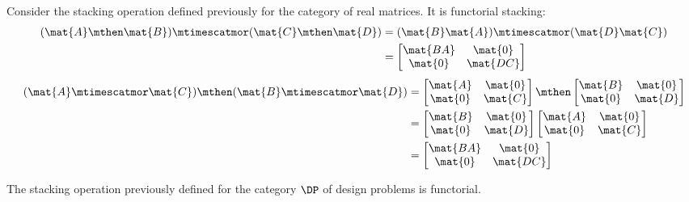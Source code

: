 \begin{example}
    Consider the stacking operation defined previously for the category of real matrices.
    It is functorial stacking:
    \begin{align}
        (\mat{A} \mthen \mat{B}) \mtimescatmor (\mat{C} \mthen \mat{D}) & = (\mat{B}\mat{A}) \mtimescatmor (\mat{D}\mat{C}) \\
                                                                        & =
        \begin{bmatrix}
            \mat{BA} & \mat{0}  \\
            \mat{0}  & \mat{DC}
        \end{bmatrix}
    \end{align}
    \begin{align}
        (\mat{A} \mtimescatmor \mat{C}) \mthen (\mat{B} \mtimescatmor \mat{D}) & =
        \begin{bmatrix}
            \mat{A} & \mat{0} \\
            \mat{0} & \mat{C}
        \end{bmatrix}
        \mthen
        \begin{bmatrix}
            \mat{B} & \mat{0} \\
            \mat{0} & \mat{D}
        \end{bmatrix} \\
                                                                               & =
        \begin{bmatrix}
            \mat{B} & \mat{0} \\
            \mat{0} & \mat{D}
        \end{bmatrix}
        \begin{bmatrix}
            \mat{A} & \mat{0} \\
            \mat{0} & \mat{C}
        \end{bmatrix} \\
                                                                               & =
        \begin{bmatrix}
            \mat{BA} & \mat{0}  \\
            \mat{0}  & \mat{DC}
        \end{bmatrix}
    \end{align}
\end{example}

\begin{example}
    The stacking operation previously defined for the category $\DP$ of design problems is functorial.
\end{example}

